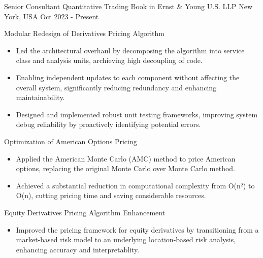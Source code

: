 

\begin{cventries}

  \cventry
    {Senior Consultant} %
    {Quantitative Trading Book in Ernst \& Young U.S. LLP} %
    {New York, USA} %
    {Oct 2023 - Present} %
    {
      \begin{cvitems}
        \item Modular Redesign of Derivatives Pricing Algorithm
        \begin{itemize}
          \item Led the architectural overhaul by decomposing the algorithm into service class and analysis units, archieving high decoupling of code.
          \item Enabling independent updates to each component without affecting the overall system, significantly reducing redundancy and enhancing maintainability.
          \item Designed and implemented robust unit testing frameworks, improving system debug reliability by proactively identifying potential errors.
        \end{itemize}
        \item Optimization of American Options Pricing
        \begin{itemize}
          \item Applied the American Monte Carlo (AMC) method to price American options, replacing the original Monte Carlo over Monte Carlo method. 
          \item Achieved a substantial reduction in computational complexity from O(n²) to O(n), cutting pricing time and saving considerable resources.
        \end{itemize}
        \item Equity Derivatives Pricing Algorithm Enhancement
        \begin{itemize}
          \item Improved the pricing framework for equity derivatives by transitioning from a market-based risk model to an underlying location-based risk analysis, enhancing accuracy and interpretablity.

\end{itemize}
\end{cvitems}}
\end{cventries}
